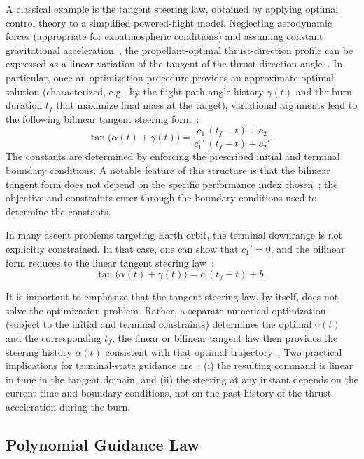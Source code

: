 A classical example is the tangent steering law, obtained by applying optimal control
theory to a simplified powered-flight model. Neglecting aerodynamic forces (appropriate
for exoatmospheric conditions) and assuming constant gravitational acceleration~\cite{Edberg}, the
propellant-optimal thrust-direction profile can be expressed as a linear variation of the
tangent of the thrust-direction angle~\cite{Edberg}.
In particular, once an optimization procedure provides an approximate optimal solution
(characterized, e.g., by the flight-path angle history $\gamma(t)$ and the burn duration $t_f$
that maximize final mass at the target), variational arguments lead to the following
bilinear tangent steering form~\cite{Ulrich}:
\begin{equation}
\tan\!\big(\alpha(t)+\gamma(t)\big)
=
\frac{c_1\,(t_f-t)+c_2}{c_1'\,(t_f-t)+c_2'} \ .
\end{equation}
The constants are determined by enforcing the prescribed initial and terminal boundary
conditions. A notable feature of this structure is that the bilinear tangent form does not
depend on the specific performance index chosen~\cite{Ulrich}; the objective and constraints enter
through the boundary conditions used to determine the constants.

In many ascent problems targeting Earth orbit, the terminal downrange is not explicitly
constrained. In that case, one can show that $c_1'=0$, and the bilinear form reduces to
the linear tangent steering law~\cite{Ulrich}:
\begin{equation}
\tan\!\big(\alpha(t)+\gamma(t)\big)
=
a\,(t_f-t)+b \ .
\end{equation}

It is important to emphasize that the tangent steering law, by itself, does not solve the
optimization problem. Rather, a separate numerical optimization (subject to the initial and
terminal constraints) determines the optimal $\gamma(t)$ and the corresponding $t_f$; the
linear or bilinear tangent law then provides the steering history $\alpha(t)$ consistent with
that optimal trajectory~\cite{Ulrich}. Two practical implications for terminal-state guidance are~\cite{Ulrich}: (i) the
resulting command is linear in time in the tangent domain, and (ii) the steering at any
instant depends on the current time and boundary conditions, not on the past history of
the thrust acceleration during the burn.


\subsection{Polynomial Guidance Law}
\label{sec:polynomial}

